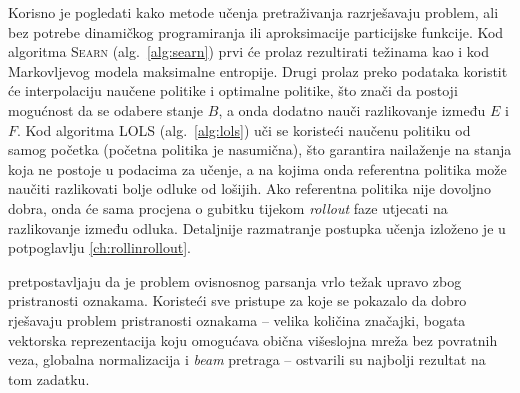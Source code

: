 Korisno je pogledati kako metode učenja pretraživanja razrješavaju problem, ali
bez potrebe dinamičkog programiranja ili aproksimacije particijske funkcije. Kod
algoritma \textsc{Searn} (alg.~\ref{alg:searn}) prvi će prolaz rezultirati
težinama kao i kod Markovljevog modela maksimalne entropije. Drugi prolaz preko
podataka koristit će interpolaciju naučene politike i optimalne politike, što znači
da postoji mogućnost da se odabere stanje $B$, a onda dodatno nauči razlikovanje
između $E$ i $F$. Kod algoritma \textsc{LOLS} (alg.~\ref{alg:lols}) uči se
koristeći naučenu politiku od samog početka (početna politika je nasumična), što
garantira nailaženje na stanja koja ne postoje u podacima za učenje, a na kojima
onda referentna politika može naučiti razlikovati bolje odluke od lošijih. Ako
referentna politika nije dovoljno dobra, onda će sama procjena o gubitku tijekom
\textit{rollout} faze utjecati na razlikovanje između odluka. Detaljnije
razmatranje postupka učenja izloženo je u potpoglavlju \ref{ch:rollinrollout}.

\citet{andor2016globally} pretpostavljaju da je problem ovisnosnog parsanja
vrlo težak upravo zbog pristranosti oznakama. Koristeći sve pristupe za koje se
pokazalo da dobro rješavaju problem pristranosti oznakama -- velika količina
značajki, bogata vektorska reprezentacija koju omogućava obična višeslojna mreža
bez povratnih veza, globalna normalizacija i \textit{beam} pretraga -- ostvarili
su najbolji rezultat na tom zadatku.

